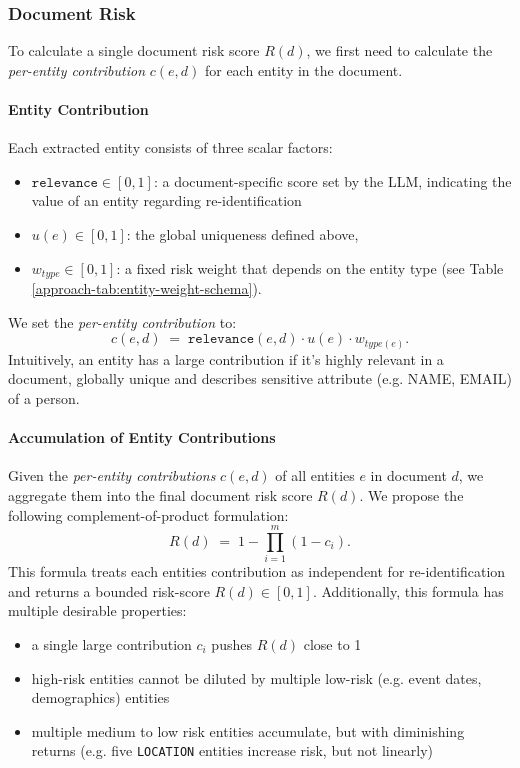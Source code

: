 \subsubsection{Document Risk}\label{approach-subsubsec:document_risk}
To calculate a single document risk score $R(d)$, we first need to calculate the \textit{per-entity contribution} $c(e,d)$ for each entity in the document.
\paragraph{Entity Contribution}
Each extracted entity consists of three scalar factors:
\begin{itemize}
    \item $\texttt{relevance}\in[0,1]$: a document-specific score set by the LLM, indicating the value of an entity regarding re-identification
    \item $u(e)\in[0,1]$: the global uniqueness defined above,
    \item $w_{type}\in[0,1]$: a fixed risk weight that depends on the entity type (see Table \ref{approach-tab:entity-weight-schema}).
\end{itemize}
We set the \textit{per-entity contribution} to:
\[
    c(e,d) \;=\; \texttt{relevance}(e,d) \cdot u(e) \cdot w_{type(e)}.
\]
Intuitively, an entity has a large contribution if it's highly relevant in a document, globally unique and describes sensitive attribute (e.g. NAME, EMAIL) of a person.
\paragraph{Accumulation of Entity Contributions}
Given the \textit{per-entity contributions} $c(e,d)$ of all entities $e$ in document $d$, we aggregate them into the final document risk score $R(d)$. We propose the following complement-of-product formulation:
\[
    R(d) \;=\; 1 - \prod_{i=1}^m (1 - c_i).
\]
This formula treats each entities contribution as independent for re-identification and returns a bounded risk-score $R(d)\in[0,1]$. Additionally, this formula has multiple desirable properties:
\begin{itemize}
    \item a single large contribution $c_i$ pushes $R(d)$ close to 1
    \item high-risk entities cannot be diluted by multiple low-risk (e.g. event dates, demographics) entities
    \item multiple medium to low risk entities accumulate, but with diminishing returns (e.g. five \texttt{LOCATION} entities increase risk, but not linearly)
\end{itemize}

